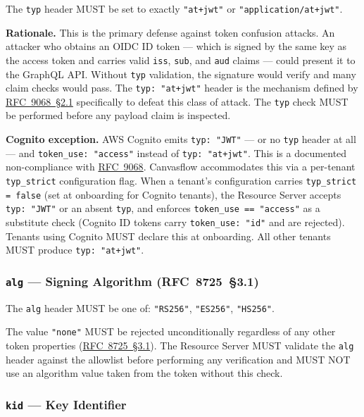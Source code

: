 The \texttt{typ} header MUST be set to exactly \texttt{"at+jwt"} or
\texttt{"application/at+jwt"}.

\textbf{Rationale.} This is the primary defense against token confusion attacks. An
attacker who obtains an OIDC ID token --- which is signed by the same key as the access
token and carries valid \texttt{iss}, \texttt{sub}, and \texttt{aud} claims --- could
present it to the GraphQL API. Without \texttt{typ} validation, the signature would
verify and many claim checks would pass. The \texttt{typ: "at+jwt"} header is the
mechanism defined by 
\href{https://datatracker.ietf.org/doc/html/rfc9068#section-2.1}{RFC~9068~\S2.1} 
specifically to defeat this class of attack. The \texttt{typ} check MUST be 
performed before any payload claim is inspected.



\textbf{Cognito exception.} AWS Cognito emits \texttt{typ: "JWT"} --- or no
\texttt{typ} header at all --- and \texttt{token\_use: "access"} instead of
\texttt{typ: "at+jwt"}. This is a documented
non-compliance with \href{https://datatracker.ietf.org/doc/html/rfc9068}{RFC~9068}. Canvasflow accommodates this via a per-tenant
\texttt{typ\_strict} configuration flag. When a tenant's configuration carries
\texttt{typ\_strict = false} (set at onboarding for Cognito tenants), the Resource
Server accepts \texttt{typ: "JWT"} or an absent \texttt{typ}, and enforces
\texttt{token\_use == "access"} as a substitute check (Cognito ID tokens carry
\texttt{token\_use: "id"} and are rejected). Tenants using Cognito MUST declare this at onboarding. All other
tenants MUST produce \texttt{typ: "at+jwt"}.

\subsubsection{\texttt{alg} --- Signing Algorithm (RFC~8725~\S3.1)}

The \texttt{alg} header MUST be one of: \texttt{"RS256"}, \texttt{"ES256"},
\texttt{"HS256"}.



The value \texttt{"none"} MUST be rejected unconditionally regardless of any other token
properties (\href{https://datatracker.ietf.org/doc/html/rfc8725#section-3.1}{RFC~8725~\S3.1}). 
The Resource Server MUST validate the \texttt{alg} header against the allowlist 
before performing any verification and MUST NOT use an algorithm
value taken from the token without this check.

\subsubsection{\texttt{kid} --- Key Identifier}

